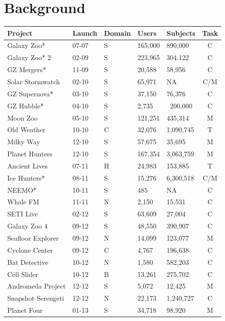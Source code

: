 \documentclass{sigchi}
\begin{document}
\section{Background}
\begin{table}
\begin{center}
\small
\begin{tabular}{p{2.2cm}lp{0.7cm}llc}
\hline
Project  & Launch & Domain & Users & Subjects & Task \\
\hline
\hline
Galaxy Zoo* & 07-07 & S & 165,000 & 890,000 & C \\
\hline
Galaxy Zoo* 2 & 02-09 & S & 223,965 & 304.122 & C \\
GZ Mergers* & 11-09 & S & 20,588 & 58,956 & C \\
\hline
Solar Stormwatch & 02-10 & S & 65,971 & NA & C/M \\
GZ Supernova* & 03-10 & S & 37,150 & 76,376 & C \\
GZ Hubble* & 04-10 & S & 2,735 & ~200,000 & C \\
Moon Zoo & 05-10 & S & 121,251 & 435,314 & M \\
Old Weather & 10-10 & C & 32,076 & 1,090,745 & T \\
Milky Way & 12-10 & S & 57,675 & 35,695 & M \\
Planet Hunters & 12-10 & S & 167,354 & 3,063,759 & M \\
\hline
Ancient Lives & 07-11 & H & 24,983 & 153,885 & T \\
Ice Hunters* & 08-11 & S & 15,276 & 6,300,518 & C/M \\
NEEMO* & 10-11 & S & 485 & NA & C \\
Whale FM & 11-11 & N & 2,150 & 15,531 & C \\
\hline
SETI Live & 02-12 & S & 63,609 & 27,004 & C \\
Galaxy Zoo 4 & 09-12 & S & 48,550 & 390,907 & C \\
Seafloor Explorer & 09-12 & N & 14,099 & 123,077 & M \\
Cyclone Center & 09-12 & C & 4,767 & 196,638 & C \\
Bat Detective & 10-12 & N & 1,580 & 582,203 & C \\
Cell Slider & 10-12 & B & 13,261 & 275,702 & C \\
Andromeda Project & 12-12 & S & 5,072 & 12,425 & M \\
Snapshot Serengeti & 12-12 & N & 22,173 & 1,240,727 & C \\
\hline
Planet Four & 01-13 & S & 34,718 & 98,920 & M \\

\end{tabular}
\end{center}
\end{table}
\end{document}
